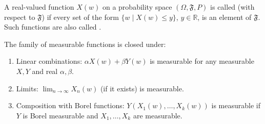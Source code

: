 A real-valued function $X(w)$ on a probability space $(\Omega, \mathfrak{F}, P)$ is called  (with respect to $\mathfrak{F}$) if every set of the form $\{w \mid X(w) \leq y\}$, $y \in \mathbb{R}$, is an element of $\mathfrak{F}$. Such functions are also called .

The family of measurable functions is closed under:
\begin{enumerate}
\item Linear combinations: $\alpha X(w) + \beta Y(w)$ is measurable for any measurable $X, Y$ and real $\alpha, \beta$.
\item Limits: $\lim_{n \to \infty} X_n(w)$ (if it exists) is measurable.
\item Composition with Borel functions: $Y(X_1(w), \ldots, X_k(w))$ is measurable if $Y$ is Borel measurable and $X_1, \ldots, X_k$ are measurable.
\end{enumerate}
